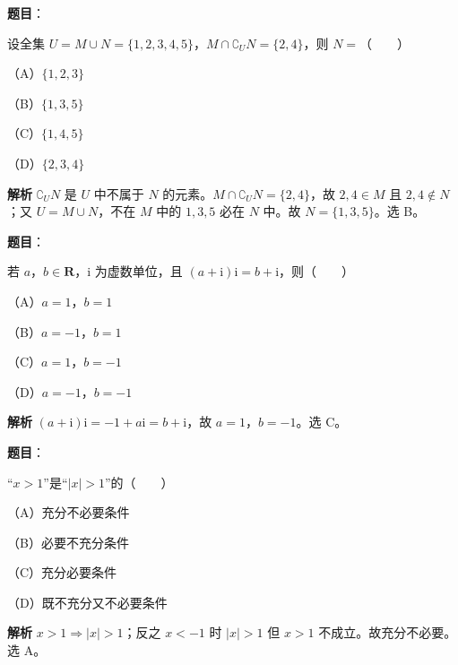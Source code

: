 
\begin{answer}

\textbf{题目}：

设全集 $U=M\cup N=\{1,2,3,4,5\}$，$M\cap\complement_UN=\{2,4\}$，则 $N=$\mbox{（　　）}

（A）$\{1,2,3\}$

（B）$\{1,3,5\}$

（C）$\{1,4,5\}$

（D）$\{2,3,4\}$

\textbf{解析}
$\complement_UN$ 是 $U$ 中不属于 $N$ 的元素。$M\cap\complement_UN=\{2,4\}$，故 $2,4\in M$ 且 $2,4\notin N$；又 $U=M\cup N$，不在 $M$ 中的 $1,3,5$ 必在 $N$ 中。故 $N=\{1,3,5\}$。选 B。


\end{answer}
\begin{answer}

\textbf{题目}：

若 $a$，$b\in\mathbf R$，$\mathrm i$ 为虚数单位，且 $(a+\mathrm i)\mathrm i=b+\mathrm i$，则\mbox{（　　）}

（A）$a=1$，$b=1$

（B）$a=-1$，$b=1$

（C）$a=1$，$b=-1$

（D）$a=-1$，$b=-1$

\textbf{解析}
$(a+\mathrm i)\mathrm i=-1+a\mathrm i=b+\mathrm i$，故 $a=1$，$b=-1$。选 C。


\end{answer}
\begin{answer}

\textbf{题目}：

“$x>1$”是“$|x|>1$”的\mbox{（　　）}

（A）充分不必要条件

（B）必要不充分条件

（C）充分必要条件

（D）既不充分又不必要条件

\textbf{解析}
$x>1\Rightarrow|x|>1$；反之 $x<-1$ 时 $|x|>1$ 但 $x>1$ 不成立。故充分不必要。选 A。


\end{answer}
